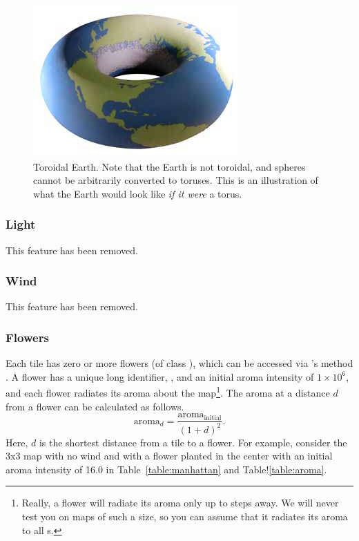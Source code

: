 \documentclass{pset}
\newcommand{\removed}{This feature has been removed.}
\begin{document}
\begin{figure}[h]
    \centering
    \includegraphics[scale=0.5]{img/torus.jpg}
    \caption{Toroidal Earth. Note that the Earth is not toroidal, and spheres
        cannot be arbitrarily converted to toruses. This is an illustration of
        what the Earth would look like \textit{if it were} a torus.}
    \label{fig:torus}
\end{figure}

\subsubsection{Light}
\removed{}

\subsubsection{Wind}
\removed{}

\subsubsection{Flowers} \label{sec:flowers}
Each tile has zero or more flowers (of class ), which can be
accessed via 's method . A flower has a
unique long identifier, , and an initial aroma intensity of $1
\times 10^6$, and each flower radiates its aroma about the map\footnote{Really,
a flower will  radiate its aroma only up to  steps
away. We will never test you on maps of such a size, so you can assume that it
radiates its aroma to all s.}. The aroma at a distance $d$ from a
flower can be calculated as follows.  \[\text{aroma}_d =
\frac{\text{aroma}_{\text{initial}}}{(1 + d)^2}.\] Here, $d$ is the shortest
distance from a tile to a flower. For example, consider the 3x3 map with no
wind and with a flower planted in the center with an initial aroma intensity of
16.0 in Table~\ref{table:manhattan} and Table!\ref{table:aroma}.
\end{document}
